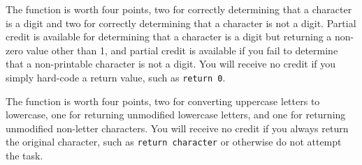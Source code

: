 The  function is worth four points, two for correctly determining that a character is a digit and two for correctly determining that a character is not a digit.
Partial credit is available for determining that a character is a digit but returning a non-zero value other than 1, and partial credit is available if you fail to determine that a non-printable character is not a digit.
You will receive no credit if you simply hard-code a return value, such as \lstinline{return 0}.

The  function is worth four points, two for converting uppercase letters to lowercase, one for returning unmodified lowercase letters, and one for returning unmodified non-letter characters.
You will receive no credit if you always return the original character, such as \lstinline{return character} or otherwise do not attempt the task.
